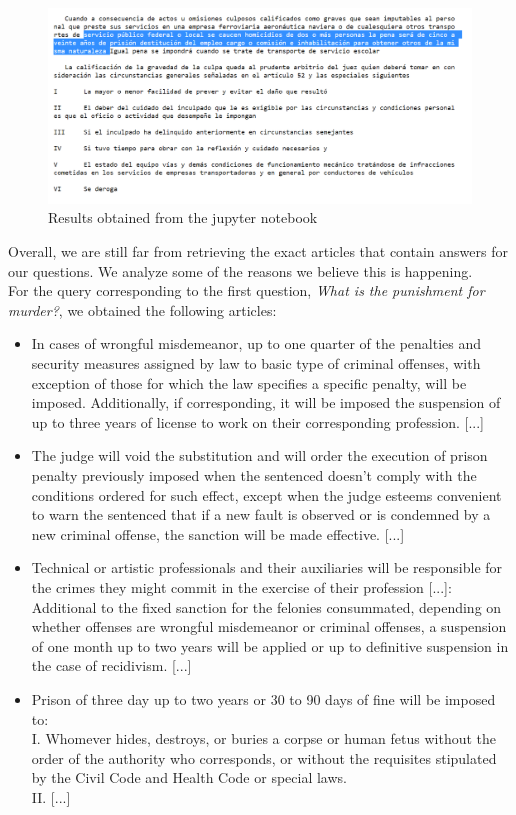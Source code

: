 \documentclass[letterpaper, margin=1in]{article}
\begin{document}
\begin{figure}
\centering
\includegraphics[width=1\textwidth]{Result.png}
\caption{\label{fig:results}Results obtained from the jupyter notebook}
\end{figure}

Overall, we are still far from retrieving the exact articles that contain answers for our questions. We analyze some of the reasons we believe this is happening. \\

For the query corresponding to the first question, \textit{What is the punishment for murder?}, we obtained the following articles:
\begin{itemize}
\item In cases of wrongful misdemeanor, up to one quarter of the penalties and security measures assigned by law to basic type of criminal offenses, with exception of those for which the law specifies a specific penalty, will be imposed. Additionally, if corresponding, it will be imposed the suspension of up to three years of license to work on their corresponding profession. [...]
\item The judge will void the substitution and will order the execution of prison penalty previously imposed when the sentenced doesn't comply with the conditions ordered for such effect, except when the judge esteems convenient to warn the sentenced that if a new fault is observed or is condemned by a new criminal offense, the sanction will be made effective. [...]
\item Technical or artistic professionals and their auxiliaries will be responsible for the crimes they might commit in the exercise of their profession [...]: \\
Additional to the fixed sanction for the felonies consummated, depending on whether offenses are wrongful misdemeanor or criminal offenses, a suspension of one month up to two years will be applied or up to definitive suspension in the case of recidivism. [...]
\item Prison of three day up to two years or 30 to 90 days of fine will be imposed to: \\
I. Whomever hides, destroys, or buries a corpse or human fetus without the order of the authority who corresponds, or without the requisites stipulated by the Civil Code and Health Code or special laws. \\
II. [...]
\end{itemize}
\end{document}
